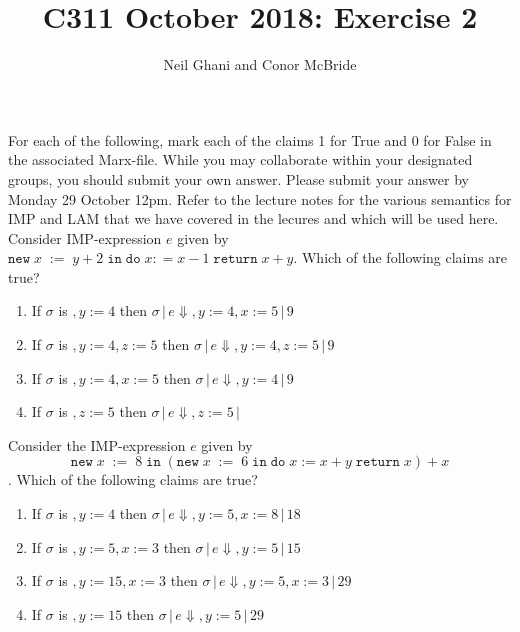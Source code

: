 \documentclass{article}
\begin{document}
\title{C311 October 2018: Exercise 2}
\author{Neil Ghani and Conor McBride}
\maketitle

\newcommand{\newe}[3]{\mathtt{new}\;#1\;\mathtt{:=}\;#2\;\mathtt{in}\;#3}
\newcommand{\newc}[3]{\mathtt{new}\;#1\;\mathtt{:=}\;#2\;\mathtt{in}\;#3}
\newcommand{\doe}[2]{\mathtt{do}\;#1\;\mathtt{return}\;#2}
\newcommand{\doret}[2]{\mathtt{do}\;#1\;\mathtt{return}\;#2}
\newcommand{\ifel}[3]{\mathtt{if}\;\mathtt{(}#1\mathtt{)}\;#2\;\mathtt{else}\;#3}
\newcommand{\whi}[2]{\mathtt{while}\; \mathtt{(}#1\mathtt{)} \;#2}
\newcommand{\ang}[1]{\langle #1 \rangle}
\newcommand{\NT}[1]{\ang{\mathit{#1}}}
\newcommand{\wk}[2]{#1 \backslash #2}
\newcommand{\evalJ}[4]{#1 \,|\, #2 \Downarrow #3 \,|\, #4}
\newcommand{\evalLam}[2]{#1 \Downarrow #2}
\newcommand{\evalE}[3]{#1 \,|\, #2 \Downarrow #3}

For each of the following, mark each of the claims 1 for True
and 0 for False in the associated Marx-file. While you may collaborate
within your designated groups, you should submit your own answer. Please submit your answer
by Monday 29 October 12pm. Refer to the lecture notes for the various
semantics for IMP and LAM that we have covered in the lecures and
which will be used here.\\[1ex]


 Consider IMP-expression $e$ given by $\newe{x}{y + 2}{\doe{x : = x-1}{x + y}}$.
Which of the following claims are true?
\begin{enumerate}
\item If $\sigma$ is $,y := 4$ then $\evalJ{\sigma}{e}{ ,y:= 4, x:=5}{9}$
\item If $\sigma$ is $,y:= 4, z:=5$ then $\evalJ{\sigma}{e}{ ,y:= 4, z:=5}{9}$
\item If $\sigma$ is $,y:= 4, x:=5$ then $\evalJ{\sigma}{e}{ ,y:= 4}{9}$
\item If $\sigma$ is $,z:=5$ then $\evalJ{\sigma}{e}{ ,z:=5}{}$
\end{enumerate}


 Consider the IMP-expression $e$ given by
$$\newe{x}{8}{(\newe{x}{6}{\doe{x := x + y}{x}}) + x}$$. Which of the 
following claims are true?
\begin{enumerate}
\item If $\sigma$ is $,y := 4$ then $\evalJ{\sigma}{e}{,y:=5, x:=8}{18}$
\item If $\sigma$  is $,y := 5, x:=3$ then $\evalJ{\sigma}{e}{,y:=5}{15}$
\item If $\sigma$ is $,y := 15, x:=3$ then $\evalJ{\sigma}{e}{,y:=5,x:=3}{29}$
\item If $\sigma$ is $,y := 15$ then $\evalJ{\sigma}{e}{,y:=5}{29}$
\end{enumerate}
\end{document}
